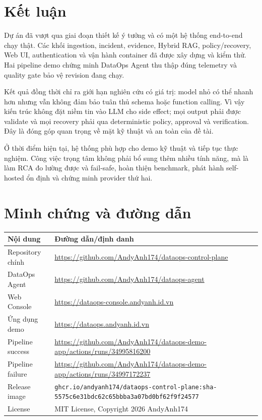 \documentclass[12pt,a4paper,oneside]{report}
\newcommand{\code}[1]{\texttt{#1}}
\begin{document}
\chapter{Kết luận}

Dự án đã vượt qua giai đoạn thiết kế ý tưởng và có một hệ thống end-to-end chạy thật. Các khối
ingestion, incident, evidence, Hybrid RAG, policy/recovery, Web UI, authentication và vận hành
container đã được xây dựng và kiểm thử. Hai pipeline demo chứng minh DataOps Agent thu thập đúng
telemetry và quality gate bảo vệ revision đang chạy.

Kết quả đồng thời chỉ ra giới hạn nghiên cứu có giá trị: model nhỏ có thể nhanh hơn nhưng vẫn không
đảm bảo tuân thủ schema hoặc function calling. Vì vậy kiến trúc không đặt niềm tin vào LLM cho
side effect; mọi output phải được validate và mọi recovery phải qua deterministic policy,
approval và verification. Đây là đóng góp quan trọng về mặt kỹ thuật và an toàn của đề tài.

Ở thời điểm hiện tại, hệ thống phù hợp cho demo kỹ thuật và tiếp tục thực nghiệm. Công việc trọng
tâm không phải bổ sung thêm nhiều tính năng, mà là làm RCA đo lường được và fail-safe, hoàn thiện
benchmark, phát hành self-hosted ổn định và chứng minh provider thứ hai.

\appendix
\chapter{Minh chứng và đường dẫn}

\begin{longtable}{L{4.5cm} L{10.0cm}}
\toprule
\textbf{Nội dung} & \textbf{Đường dẫn/định danh} \\
\midrule
Repository chính & \url{https://github.com/AndyAnh174/dataops-control-plane} \\
DataOps Agent & \url{https://github.com/AndyAnh174/dataops-agent} \\
Web Console & \url{https://dataops-console.andyanh.id.vn} \\
Ứng dụng demo & \url{https://dataops.andyanh.id.vn} \\
Pipeline success & \url{https://github.com/AndyAnh174/dataops-demo-app/actions/runs/34995816200} \\
Pipeline failure & \url{https://github.com/AndyAnh174/dataops-demo-app/actions/runs/34997172237} \\
Release image & \code{ghcr.io/andyanh174/dataops-control-plane:sha-5575c6e31bdc62c65bbba3a07bd0bf62f9f24577} \\
License & MIT License, Copyright 2026 AndyAnh174 \\
\bottomrule
\end{longtable}
\end{document}
